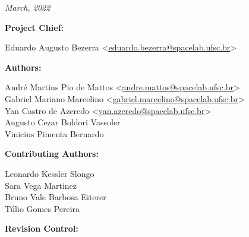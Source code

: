 %
%
%
%
%

%
%
%
%
%

\thispagestyle{empty}

\begin{center}

\textbf{\thetitle}

\textit{March, 2022}

\vspace{1cm}

\textbf{Project Chief:}

Eduardo Augusto Bezerra <\href{mailto:eduardo.bezerra@spacelab.ufsc.br}{eduardo.bezerra@spacelab.ufsc.br}>

\vspace{1cm}

\textbf{Authors:}

André Martins Pio de Mattos <\href{mailto:andre.mattos@spacelab.ufsc.br}{andre.mattos@spacelab.ufsc.br}>\\
Gabriel Mariano Marcelino <\href{mailto:gabriel.marcelino@spacelab.ufsc.br}{gabriel.marcelino@spacelab.ufsc.br}>\\
Yan Castro de Azeredo <\href{mailto:yan.azeredo@spacelab.ufsc.br}{yan.azeredo@spacelab.ufsc.br}>\\
Augusto Cezar Boldori Vassoler \\ 
Vinicius Pimenta Bernardo \\

\vspace{1cm}

\textbf{Contributing Authors:}

Leonardo Kessler Slongo \\
Sara Vega Martinez \\
Bruno Vale Barbosa Eiterer \\
Túlio Gomes Pereira \\

\vspace{1cm}


\textbf{Revision Control:}

\end{center}


